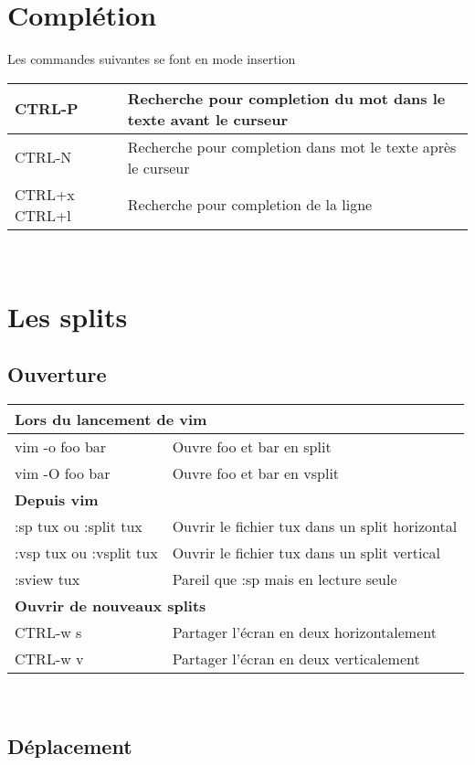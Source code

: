 \documentclass{article}
\begin{document}
\section{Complétion}
Les commandes suivantes se font en mode insertion\\


\begin{tabular}{|p{3cm}| l|  }
    \hline
CTRL-P & Recherche pour completion du mot dans le texte avant le curseur \\ \hline
CTRL-N & Recherche pour completion dans mot le texte après le curseur \\ \hline 
CTRL+x CTRL+l &	Recherche pour completion de la ligne \\ \hline
\end{tabular}\\


\section{Les splits} 
\subsection{Ouverture}
\begin{tabular}{|p{3cm}| l|  }\hline
\multicolumn{2}{|l|}{\textbf{Lors du lancement de vim }} \\ \hline
    vim -o foo bar & Ouvre foo et bar en split\\ \hline
    vim -O foo bar & Ouvre foo et bar en vsplit\\ \hline
\multicolumn{2}{|l|}{\textbf{Depuis vim}}\\ \hline
	:sp tux ou :split tux & Ouvrir le fichier tux dans un split horizontal	\\ \hline
    :vsp tux ou :vsplit tux & Ouvrir le fichier tux dans un split vertical	\\ \hline
    :sview tux & Pareil que :sp mais en lecture seule \\ \hline
\multicolumn{2}{|l|}{\textbf{Ouvrir de nouveaux splits }} \\ \hline
	CTRL-w s & Partager l'écran en deux horizontalement	\\ \hline
    CTRL-w v & Partager l'écran en deux verticalement	\\ \hline
\end{tabular}\\

\subsection{Déplacement}
\end{document}
